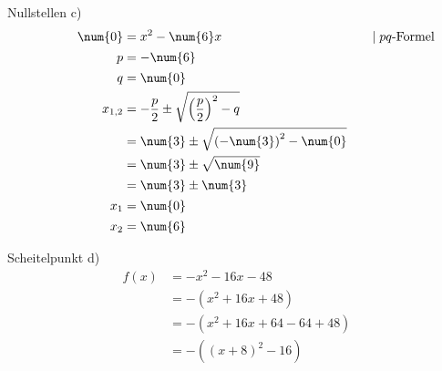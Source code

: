 \begin{exercise}
    \begin{minipage}[t]{0.49\linewidth}
      Nullstellen c)
      \small
      \begingroup
        \newcommand{\vstrut}{\vphantom{\left(f_0^0\right)}}%
        \newcommand{\noeq}{\phantom{\Leftrightarrow}\vstrut&\quad}%
        \newcommand{\iseq}{\Leftrightarrow\vstrut&\quad}%
        \newcommand{\impl}{\Rightarrow\vstrut&\quad}%
        \newcommand{\nomod}{\quad&\phantom{|}}%
        \newcommand{\domod}[1]{\quad&|#1}%
        \begin{alignat*}{3}
          \noeq
          &
          \num{0}&=x^{2}-\num{6}x
          &
          \domod{\;\text{$pq$-Formel}}
          \\
          \noeq
          &
          p&=-\num{6}
          &
          \nomod
          \\
          \noeq
          &
          q&=\num{0}
          &
          \nomod
          \\
          \noeq
          &
          x_{1,2}&=-\frac{p}{2}\pm\sqrt{\left(\frac{p}{2}\right)^2-q}
          &
          \nomod
          \\
          \noeq
          &
          &=\num{3}\pm\sqrt{\left(-\num{3}\right)^2-\num{0}}
          &
          \nomod
          \\
          \noeq
          &
          &=\num{3}\pm\sqrt{\num{9}}
          &
          \nomod
          \\
          \noeq
          &
          &=\num{3}\pm\num{3}
          &
          \nomod
          \\
          \noeq
          &
          x_1&=\num{0}
          &
          \nomod
          \\
          \noeq
          &
          x_2&=\num{6}
          &
          \nomod
        \end{alignat*}
      \endgroup
    \end{minipage}\bigskip\par
    \begin{minipage}[t]{0.49\linewidth}
      Scheitelpunkt d)
      \small
      \begin{equation*}
        \begin{split}
          f(x)&=-x^{2}-16x-48
          \\
          &=-\left(x^2+16x+48\right)
          \\
          &=-\left(x^2+16x+64-64+48\right)
          \\
          &=-\left((x+8)^2-16\right)

\end{split}
\end{equation*}
\end{minipage}
\end{exercise}

